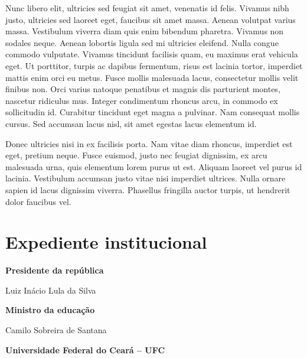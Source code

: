 \documentclass[
  letterpaper,
  DIV=11,
  numbers=noendperiod,
  oneside]{scrreprt}
\begin{document}
Nunc libero elit, ultricies sed feugiat sit amet, venenatis id felis.
Vivamus nibh justo, ultricies sed laoreet eget, faucibus sit amet massa.
Aenean volutpat varius massa. Vestibulum viverra diam quis enim bibendum
pharetra. Vivamus non sodales neque. Aenean lobortis ligula sed mi
ultricies eleifend. Nulla congue commodo vulputate. Vivamus tincidunt
facilisis quam, eu maximus erat vehicula eget. Ut porttitor, turpis ac
dapibus fermentum, risus est lacinia tortor, imperdiet mattis enim orci
eu metus. Fusce mollis malesuada lacus, consectetur mollis velit finibus
non. Orci varius natoque penatibus et magnis dis parturient montes,
nascetur ridiculus mus. Integer condimentum rhoncus arcu, in commodo ex
sollicitudin id. Curabitur tincidunt eget magna a pulvinar. Nam
consequat mollis cursus. Sed accumsan lacus nisl, sit amet egestas lacus
elementum id.

Donec ultricies nisi in ex facilisis porta. Nam vitae diam rhoncus,
imperdiet est eget, pretium neque. Fusce euismod, justo nec feugiat
dignissim, ex arcu malesuada urna, quis elementum lorem purus ut est.
Aliquam laoreet vel purus id lacinia. Vestibulum accumsan justo vitae
nisi imperdiet ultrices. Nulla ornare sapien id lacus dignissim viverra.
Phasellus fringilla auctor turpis, ut hendrerit dolor faucibus vel.


\hypertarget{expediente-institucional}{%
\chapter*{Expediente institucional}\label{expediente-institucional}}


\textbf{Presidente da república}

Luiz Inácio Lula da Silva

\textbf{Ministro da educação}

Camilo Sobreira de Santana

\textbf{Universidade Federal do Ceará -- UFC}

\end{document}
